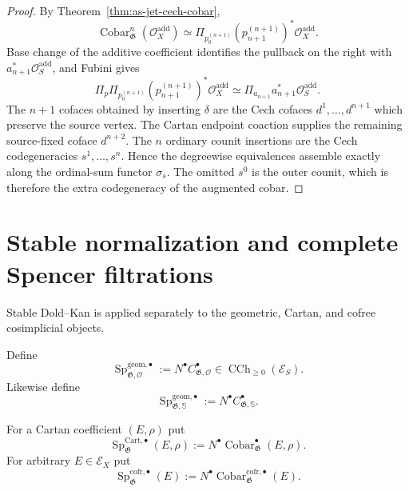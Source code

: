 \begin{proof}
By Theorem~\ref{thm:as-jet-cech-cobar},
\[
    \operatorname{Cobar}^{n}_{\mathfrak G}
    (\mathcal O_X^{\mathrm{add}})
    \simeq
    \Pi_{p_0^{(n+1)}}
    (p_{n+1}^{(n+1)})^*
    \mathcal O_X^{\mathrm{add}}.
\]
Base change of the additive coefficient identifies the pullback on the right
with $a_{n+1}^*\mathcal O_S^{\mathrm{add}}$, and Fubini gives
\[
    \Pi_p\Pi_{p_0^{(n+1)}}
    (p_{n+1}^{(n+1)})^*
    \mathcal O_X^{\mathrm{add}}
    \simeq
    \Pi_{a_{n+1}}a_{n+1}^*\mathcal O_S^{\mathrm{add}}.
\]
The $n+1$ cofaces obtained by inserting $\delta$ are the Cech cofaces
$d^1,\ldots,d^{n+1}$ which preserve the source vertex.  The Cartan endpoint
coaction supplies the remaining source-fixed coface $d^{n+2}$.  The $n$
ordinary counit insertions are the Cech codegeneracies
$s^1,\ldots,s^n$.  Hence the degreewise equivalences assemble exactly along
the ordinal-sum functor $\sigma_s$.  The omitted $s^0$ is the outer counit,
which is therefore the extra codegeneracy of the augmented cobar.
\end{proof}

\section{Stable normalization and complete Spencer filtrations}
\label{sec:as-spencer-normalization}

Stable Dold--Kan is applied separately to the geometric, Cartan, and cofree
cosimplicial objects.

\begin{definition}
\label{def:as-spencer}
Define
\[
\boxed{
    \operatorname{Sp}^{\mathrm{geom},\bullet}_{\mathfrak G,\mathcal O}
    :=
    N^\bullet C_{\mathfrak G,\mathcal O}^{\bullet}
    \in
    \operatorname{CCh}_{\geq0}(\mathcal E_S).
}
\]
Likewise define
\[
    \operatorname{Sp}^{\mathrm{geom},\bullet}_{\mathfrak G,\mathbb S}
    :=
    N^\bullet C_{\mathfrak G,\mathbb S}^{\bullet}.
\]
\end{definition}

\begin{definition}
\label{def:as-cartan-cofree-spencer}
For a Cartan coefficient $(E,\rho)$ put
\[
\boxed{
    \operatorname{Sp}^{\mathrm{Cart},\bullet}_{\mathfrak G}(E,\rho)
    :=
    N^\bullet
    \operatorname{Cobar}_{\mathfrak G}^{\bullet}(E,\rho).
}
\]
For arbitrary $E\in\mathcal E_X$ put
\[
\boxed{
    \operatorname{Sp}^{\mathrm{cofr},\bullet}_{\mathfrak G}(E)
    :=
    N^\bullet
    \operatorname{Cobar}^{\mathrm{cofr},\bullet}_{\mathfrak G}(E).
}
\]
\end{definition}

